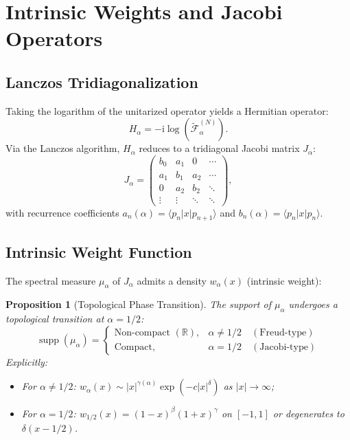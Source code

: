 \documentclass[12pt,a4paper]{article}
\theoremstyle{definition}
\theoremstyle{plain}
\newtheorem{proposition}[theorem]{Proposition}
\theoremstyle{remark}
\DeclareMathOperator{\supp}{supp}
\newcommand{\F}{\mathcal{F}}
\newcommand{\R}{\mathbb{R}}
\newcommand{\ii}{\mathrm{i}}
\begin{document}
\section{Intrinsic Weights and Jacobi Operators}

\subsection{Lanczos Tridiagonalization}
Taking the logarithm of the unitarized operator yields a Hermitian operator:
\[
H_\alpha = -\ii \log(\tilde{\F}_\alpha^{(N)}).
\]
Via the Lanczos algorithm, $H_\alpha$ reduces to a tridiagonal Jacobi matrix $J_\alpha$:
\begin{equation}\label{eq:jacobi}
J_\alpha = \begin{pmatrix} 
b_0 & a_1 & 0 & \cdots \\
a_1 & b_1 & a_2 & \cdots \\
0 & a_2 & b_2 & \ddots \\
\vdots & \vdots & \ddots & \ddots
\end{pmatrix},
\end{equation}
with recurrence coefficients $a_n(\alpha) = \langle p_n | x | p_{n+1} \rangle$ and $b_n(\alpha) = \langle p_n | x | p_n \rangle$.

\subsection{Intrinsic Weight Function}
The spectral measure $\mu_\alpha$ of $J_\alpha$ admits a density $w_\alpha(x)$ (intrinsic weight):

\begin{proposition}[Topological Phase Transition]\label{prop:weight}
The support of $\mu_\alpha$ undergoes a topological transition at $\alpha = 1/2$:
\begin{equation}
\supp(\mu_\alpha) = 
\begin{cases}
\text{Non-compact } (\R), & \alpha \neq 1/2 \quad (\text{Freud-type}) \\
\text{Compact}, & \alpha = 1/2 \quad (\text{Jacobi-type})
\end{cases}
\end{equation}
Explicitly:
\begin{itemize}
    \item For $\alpha \neq 1/2$: $w_\alpha(x) \sim |x|^{\gamma(\alpha)} \exp(-c|x|^\delta)$ as $|x| \to \infty$;
    \item For $\alpha = 1/2$: $w_{1/2}(x) = (1-x)^\beta(1+x)^\gamma$ on $[-1,1]$ or degenerates to $\delta(x-1/2)$.
\end{itemize}
\end{proposition}
\end{document}

